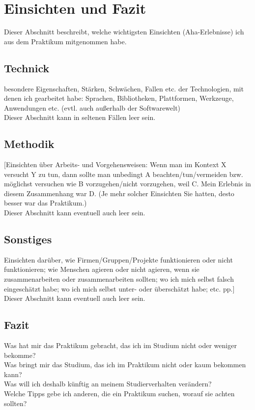 \section{Einsichten und Fazit}
Dieser Abschnitt beschreibt, welche wichtigsten Einsichten (Aha-Erlebnisse) ich aus dem
Praktikum mitgenommen habe.

\subsection{Technick}
besondere Eigenschaften, Stärken, Schwächen, Fallen etc. der Technologien, mit denen
ich gearbeitet habe: Sprachen, Bibliotheken, Plattformen, Werkzeuge, Anwendungen etc.
(evtl. auch außerhalb der Softwarewelt)\\
Dieser Abschnitt kann in seltenen Fällen leer sein.

\subsection{Methodik}
[Einsichten über Arbeits- und Vorgehensweisen: Wenn man im Kontext X versucht Y zu
tun, dann sollte man unbedingt A beachten/tun/vermeiden bzw. möglichst versuchen wie
B vorzugehen/nicht vorzugehen, weil C. Mein Erlebnis in diesem Zusammenhang war D.
(Je mehr solcher Einsichten Sie hatten, desto besser war das Praktikum.)\\
Dieser Abschnitt kann eventuell auch leer sein.

\subsection{Sonstiges}
Einsichten darüber, wie Firmen/Gruppen/Projekte funktionieren oder nicht funktionieren;
wie Menschen agieren oder nicht agieren, wenn sie zusammenarbeiten oder
zusammenarbeiten sollten; wo ich mich selbst falsch eingeschätzt habe; wo ich mich
selbst unter- oder überschätzt habe; etc. pp.]\\
Dieser Abschnitt kann eventuell auch leer sein.

\subsection{Fazit}
Was hat mir das Praktikum gebracht, das ich im Studium nicht oder weniger bekomme?\\
Was bringt mir das Studium, das ich im Praktikum nicht oder kaum bekommen kann?\\
Was will ich deshalb künftig an meinem Studierverhalten verändern?\\
Welche Tipps gebe ich anderen, die ein Praktikum suchen, worauf sie achten sollten?\\

